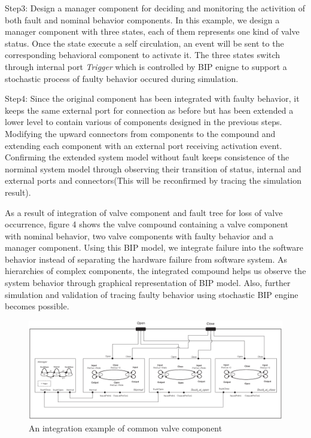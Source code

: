 \documentclass[conference]{IEEEtran}
\begin{document}
Step3: Design a manager component for deciding and monitoring the activition of both fault and nominal behavior components. In this example, we design a manager component with three states, each of them represents one kind of valve status. Once the state execute a self circulation, an event will be sent to the corresponding behavioral component to activate it. The three states switch through internal port \emph{Trigger} which is controlled by BIP enigne to support a stochastic process of faulty behavior occured during simulation.

Step4: Since the original component has been integrated with faulty behavior, it keeps the same external port for connection  as before but has been extended a lower level to contain various of components designed in the previous steps. Modifying the upward connectors from components to the compound and extending each component with an external port receiving activation event. Confirming the extended system model without fault keeps consistence of the norminal system model through observing their transition of status, internal and external ports and connectors(This will be reconfirmed by tracing the simulation result).

As a result of integration of valve component and fault tree for loss of valve occurrence, figure 4 shows the valve compound containing a valve component with nominal behavior, two valve components with faulty behavior and a manager component. Using this BIP model, we integrate failure into the software behavior instead of separating the hardware failure from software system. As hierarchies of complex components, the integrated compound helps us observe the system behavior through graphical representation of BIP model. Also, further simulation and validation of tracing faulty behavior using stochastic BIP engine becomes possible.

\begin{figure}[htbp]
	\centerline{\includegraphics[width=165mm]{figure/Example.eps}}
	\caption{An integration example of common valve component}
	\label{Example}
\end{figure}
\end{document}
